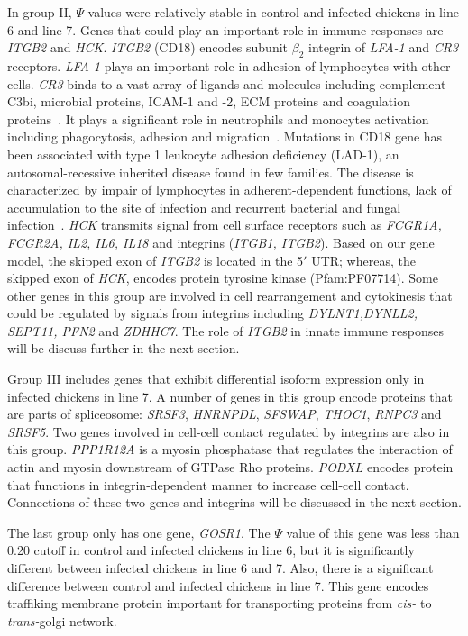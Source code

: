 \documentclass[10pt]{article}
\begin{document}
In group II, $\Psi$ values were relatively stable in control and infected chickens in line 6 and line 7.
Genes that could play an important role in immune responses are \textit{ITGB2} and \textit{HCK}.
\textit{ITGB2} (CD18) encodes subunit $\beta_{2}$ integrin of \textit{LFA-1} and \textit{CR3} receptors.
\textit{LFA-1} plays an important role in adhesion of lymphocytes with other cells.
\textit{CR3} binds to a vast array of ligands and molecules including complement C3bi, microbial proteins,
ICAM-1 and -2, ECM proteins and coagulation proteins~\cite{}.
It plays a significant role in neutrophils and monocytes activation including phagocytosis, adhesion and
migration~\cite{}.
Mutations in CD18 gene has been associated with type 1 leukocyte adhesion deficiency (LAD-1),
an autosomal-recessive inherited disease found in few families.
The disease is characterized by impair of lymphocytes in adherent-dependent functions, lack of accumulation
to the site of infection and recurrent bacterial and fungal infection~\cite{}.
\textit{HCK} transmits signal from cell surface receptors such as \textit{FCGR1A, FCGR2A, IL2, IL6,
IL18} and integrins (\textit{ITGB1, ITGB2}).
Based on our gene model, the skipped exon of \textit{ITGB2} is located in the 5$\prime$ UTR;
whereas, the skipped exon of \textit{HCK}, encodes protein tyrosine kinase (Pfam:PF07714).
Some other genes in this group are involved in cell rearrangement and cytokinesis that could be
regulated by signals from integrins including \textit{DYLNT1,DYNLL2, SEPT11, PFN2} and \textit{ZDHHC7}.
The role of \textit{ITGB2} in innate immune responses will be discuss further in the next section.

Group III includes genes that exhibit differential isoform expression only in infected chickens in line 7.
A number of genes in this group encode proteins that are parts of spliceosome: \textit{SRSF3}, \textit{HNRNPDL},
\textit{SFSWAP}, \textit{THOC1}, \textit{RNPC3} and \textit{SRSF5}.
Two genes involved in cell-cell contact regulated by integrins are also in this group.
\textit{PPP1R12A} is a myosin phosphatase that regulates the interaction of actin and myosin downstream of GTPase
Rho proteins.
\textit{PODXL} encodes protein that functions in integrin-dependent manner to increase cell-cell contact.
Connections of these two genes and integrins will be discussed in the next section.

The last group only has one gene, \textit{GOSR1}.
The $\Psi$ value of this gene was less than 0.20 cutoff in control and infected chickens in line 6, but it is
significantly different between infected chickens in line 6 and 7.
Also, there is a significant difference between control and infected chickens in line 7.
This gene encodes traffiking membrane protein important for transporting proteins from \textit{cis-} to
\textit{trans-}golgi network.
\end{document}
